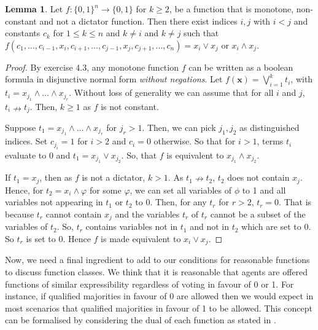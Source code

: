 \documentclass[11pt,a4paper, titlepage]{article}
\theoremstyle{definition}
\newtheorem{lemma}[theorem]{Lemma}
\let\vec\mathbf
\begin{document}
\begin{lemma}
    \label{lem:boolean}
    Let $f \colon \{0,1\}^n \longrightarrow \{0,1\}$ for $k \geq 2$, be a function that is monotone, non-constant and not a dictator function.
    Then there exist indices $i, j$ with $i < j$ and constants $c_k$ for $1 \leq k \leq n$ and $k \neq i$ and $k \neq j$ such that $f(c_1, \ldots, c_{i-1}, x_i, c_{i+1}, \ldots, c_{j-1}, x_j, c_{j+1}, \ldots, c_n) = x_i \lor x_j$ or $x_i \land x_j$.
\end{lemma}

\begin{proof}
    By \cite{boolean} exercise 4.3, any monotone function $f$ can be written as a boolean formula in disjunctive normal form \emph{without negations}.
    Let $f(\vec{x}) = \bigvee_{i = 1}^k t_i$, with $t_i = x_{j_1} \land \ldots \land x_{j_r}$.
    Without loss of generality we can assume that for all $i$ and $j$, $t_i \nrightarrow t_j$.
    Then, $k \geq 1$ as $f$ is not constant.
    
    Suppose $t_1 = x_{j_1} \land \ldots \land x_{j_r}$ for $j_r > 1$. 
    Then, we can pick $j_1, j_2$ as distinguished indices. Set $c_{j_i} = 1$ for $i > 2$ and $c_i = 0$ otherwise.
    So that for $i > 1$, terms $t_i$ evaluate to $0$ and $t_1 =x_{j_1} \lor x_{j_2}$.
    So, that $f$ is equivalent to $x_{j_1} \land x_{j_2}$.
    
    If $t_1 = x_j$, then as $f$ is not a dictator, $k > 1$.
    As $t_1 \nrightarrow t_2$, $t_2$ does not contain $x_j$.
    Hence, for $t_2 = x_i \land \varphi$ for some $\varphi$, we can set all variables of $\phi$ to 1 and all variables not appearing in $t_1$ or $t_2$ to 0.
    Then, for any $t_r$ for $r > 2$, $t_r = 0$. That is because $t_r$ cannot contain $x_j$ and the variables $t_r$ of $t_r$ cannot be a subset of the variables of $t_2$.
    So, $t_r$ contains variables not in $t_1$ and not in $t_2$ which are set to $0$. So $t_r$ is set to 0.
    Hence $f$ is made equivalent to $x_i \lor x_j$.
\end{proof}

Now, we need a final ingredient to add to our conditions for reasonable functions to discuss function classes.
We think that it is reasonable that agents are offered functions of similar expressibility regardless of voting in favour of 0 or 1.
For instance, if qualified majorities in favour of 0 are allowed then we would expect in most scenarios that qualified majorities in favour of 1 to be allowed.
This concept can be formalised by considering the dual of each function as stated in \cite{boolean}.
\end{document}
